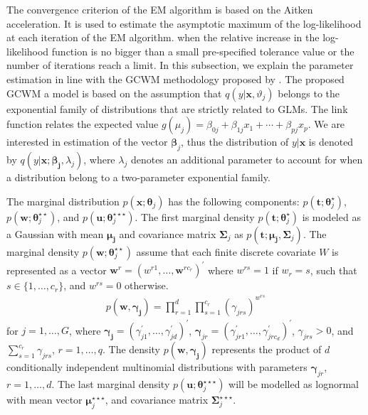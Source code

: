 \documentclass[11pt,letterpaper]{article}
\numberwithin{equation}{section}
\numberwithin{equation}{section}
\numberwithin{equation}{section}
\begin{document}
The convergence criterion of the EM algorithm is based on the Aitken acceleration. It is used to estimate the asymptotic maximum of the log-likelihood at each iteration of the EM algorithm.  when the relative increase in the log-likelihood function is no bigger than a small pre-specified tolerance value or the number of iterations reach a limit. %
In this subsection, we explain the parameter estimation in line with the GCWM methodology proposed by \cite{Ingrassia+Punzo+Vittadini+Minotti:2015}. The proposed GCWM a model is based on the assumption that $q(y|\bm{x},\vartheta_j)$ belongs to the exponential family of distributions that are strictly related to GLMs. The link function relates the expected value $g(\mu_j)= \beta_{0j} + \beta_{1j} x_{1}+ \cdots+\beta_{pj} x_{p}$. We are interested in estimation of the vector $\bm \beta_j$, thus the distribution of $y|\bm{x}$ is denoted by $q(y|\bm{x}; \bm{\beta_j}, \lambda_j)$, where $\lambda_j$ denotes an additional parameter to account for when a distribution belong to a two-parameter exponential family.

The marginal distribution $p(\bm{x}; \bm \theta_j)$ has the following components: $p(\bm{t}; \bm \theta_j^{\star})$, $p(\bm{w}; \bm \theta_j^{\star\star})$, and $p(\bm{u};\bm \theta_{j}^{\star\star\star})$. The first marginal density $p(\bm{t}; \bm \theta_j^{\star})$ is modeled as a  Gaussian with mean $\bm {\mu_j}$ and covariance matrix $\bm \Sigma_j$ as $p(\bm t; \bm {\mu_j}, \bm \Sigma_j)$. The marginal density $p(\bm{w};\bm \theta_{j}^{\star\star})$ assume that each finite discrete covariate $W$ is represented as a vector $\bm{w}^r=(w^{r1},\ldots,\bm{w}^{rc_r})^{'}$ where $w^{rs}=1$ if $w_r = s$, such that $s\in\{1, \ldots, c_r\}$, %
and $w^{rs}=0$ otherwise.
\begin{align}
p(\bm {w}, \bm {\gamma_j})=\prod_{r=1}^{d}\prod_{s=1}^{c_r}(\gamma_{jrs} )^{w^{rs}} 
\label{eq31}
\end{align}
for $j=1, \ldots, G$, where $\bm {\gamma_j}=(\gamma_{j1}^{'}, \ldots, \gamma_{jd}^{'})^{'}$, $\bm \gamma_{jr}=(\gamma_{jr1}^{'}, \ldots, \gamma_{jrc_d}^{'})^{'}$, $\gamma_{jrs} > 0$, and  $\sum_{s=1}^{c_r}\gamma_{jrs}$, $r=1,\ldots,q$. The density $p(\bm {w}, \bm{\gamma_j})$ represents the product of $d$ conditionally independent multinomial distributions with parameters $\bm{\gamma}_{jr}$, $r=1,\ldots, d$. The last marginal density $p(\bm{u};\bm \theta_{j}^{\star\star\star})$ will be modelled as lognormal with mean vector $ \bm \mu_j^{\star\star\star}$, and covariance matrix $\bm \Sigma_j^{\star\star\star} $. 
\end{document}
